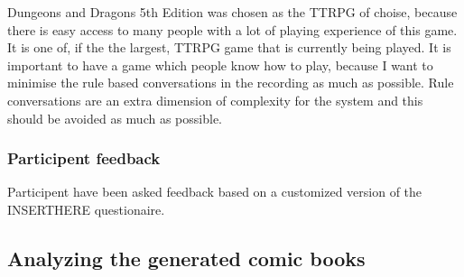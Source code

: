 Dungeons and Dragons 5th Edition was chosen as the TTRPG of choise, because there is easy access to many people with a lot of playing experience of this game. It is one of, if the the largest, TTRPG game that is currently being played. It is important to have a game which people know how to play, because I want to minimise the rule based conversations in the recording as much as possible. Rule conversations are an extra dimension of complexity for the system and this should be avoided as much as possible.

\subsubsection{}


\subsubsection{Participent feedback}
Participent have been asked feedback based on a customized version of the INSERTHERE questionaire. 

\subsection{Analyzing the generated comic books}
